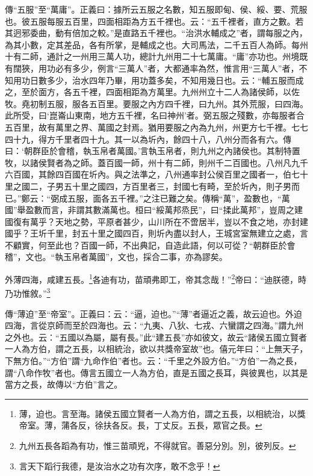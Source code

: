 {\noindent\zhuan{}\fzbyks 傳“五服”至“萬庸”。正義曰：據所云五服之名數，知五服即甸、侯、綏、要、荒服也。彼五服每服五百里，四面相距為方五千裡也。云：“五千裡者，直方之數。若其迥邪委曲，動有倍加之較。”是直路五千裡也。“治洪水輔成之”者，謂每服之內，為其小數，定其差品，各有所掌，是輔成之也。大司馬法，二千五百人為師。每州十有二師，通計之一州用三萬人功，總計九州用二十七萬庸。“庸”亦功也。州境既有闊狹，用功必有多少，例言“三萬人”者，大都通率為然，惟言用“三萬人”者，不知用功日數多少，治水四年乃畢，用功蓋多矣，不知用幾日也。云：“輔五服而成之，至於面方，各五千裡，四面相距為方萬里。九州州立十二人為諸侯師，以佐牧。堯初制五服，服各五百里。要服之內方四千裡，曰九州。其外荒服，曰四海。此所受，曰‘崑崙山東南，地方五千裡，名曰神州’者。弼五服之殘數，亦每服者合五百里，故有萬里之界、萬國之封焉。猶用要服之內為九州，州更方七千裡。七七四十九，得方千里者四十九。其一以為圻內，餘四十八，八州分而各有六。傳曰：‘朝群臣於會稽，執玉帛者萬國。’言執玉帛者，則九州之內諸侯也。其制特置牧，以諸侯賢者為之師。蓋百國一師，州十有二師，則州千二百國也。八州凡九千六百國，其餘四百國在圻內。與之法準之，八州通率封公侯百里之國者一，伯七十里之國二，子男五十里之國四，方百里者三，封國七有畸，至於圻內，則子男而已。”鄭云：“弼成五服，面各五千裡。”之注已難之矣。傳稱“萬”，盈數也，“萬國”舉盈數而言，非謂其數滿萬也。桓曰“綏萬邦烝民”，曰“揉此萬邦”，豈周之建國復有萬乎？天地之勢，平原者甚少，山川所在不啻居半，豈以不食之地，亦封建國乎？王圻千里，封五十里之國四百，則圻內盡以封人，王城宮室無建立之處，言不顧實，何至此也？百國一師，不出典記，自造此語，何以可從？“朝群臣於會稽”，文也。“執玉帛者萬國”，文也，採合二事，亦為謬矣。 \par}

外薄四海，咸建五長。\footnote{薄，迫也。言至海。諸侯五國立賢者一人為方伯，謂之五長，以相統治，以獎帝室。薄，蒲各反，徐扶各反。長，丁丈反。五長，眾官之長。}各迪有功，苗頑弗即工，帝其念哉！”\footnote{九州五長各蹈為有功，惟三苗頑兇，不得就官。善惡分別。別，彼列反。}帝曰：“迪朕德，時乃功惟敘。”\footnote{言天下蹈行我德，是汝治水之功有次序，敢不念乎！}

{\noindent\zhuan{}\fzbyks 傳“薄迫”至“帝室”。正義曰：云：“逼，迫也。”“薄”者逼近之義，故云迫也。外迫四海，言從京師而至於四海也。云：“九夷、八狄、七戎、六蠻謂之四海。”謂九州之外也。云：“五國以為屬，屬有長。”此“建五長”亦如彼文，故云“諸侯五國立賢者一人為方伯，謂之五長，以相統治，欲以共獎帝室故”也。僖元年曰：“上無天子，下無方伯。”“方伯”謂“九命作伯”者也。云：“千里之外設方伯。”“方伯”一為之長，謂“八命作牧”者也。傳言五國立一人為方伯，直是五國之長耳，與彼異也，以其是當方之長，故傳以“方伯”言之。 \par}

